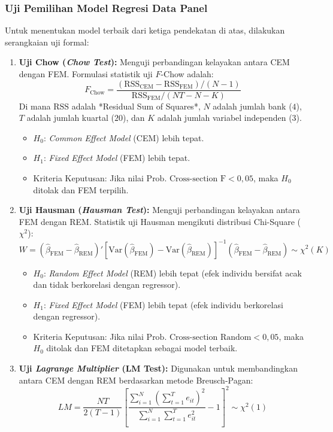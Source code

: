 \documentclass[12pt,a4paper]{article}
\numberwithin{equation}{section}
\begin{document}
\subsubsection{Uji Pemilihan Model Regresi Data Panel}
\noindent
Untuk menentukan model terbaik dari ketiga pendekatan di atas, dilakukan serangkaian uji formal:
\begin{enumerate}
  \item \textbf{Uji Chow (\emph{Chow Test}):} Menguji perbandingan kelayakan antara CEM dengan FEM. Formulasi statistik uji $F$-Chow adalah:
    \begin{equation}
      F_{\text{Chow}} = \frac{(\text{RSS}_{\text{CEM}} - \text{RSS}_{\text{FEM}}) / (N - 1)}{\text{RSS}_{\text{FEM}} / (NT - N - K)}
    \end{equation}
    Di mana $\text{RSS}$ adalah *Residual Sum of Squares*, $N$ adalah jumlah bank ($4$), $T$ adalah jumlah kuartal ($20$), dan $K$ adalah jumlah variabel independen ($3$).
    \begin{itemize}
      \item $H_0$: \emph{Common Effect Model} (CEM) lebih tepat.
      \item $H_1$: \emph{Fixed Effect Model} (FEM) lebih tepat.
      \item Kriteria Keputusan: Jika nilai $\text{Prob. Cross-section F} < 0{,}05$, maka $H_0$ ditolak dan FEM terpilih.
    \end{itemize}
  \item \textbf{Uji Hausman (\emph{Hausman Test}):} Menguji perbandingan kelayakan antara FEM dengan REM. Statistik uji Hausman mengikuti distribusi Chi-Square ($\chi^2$):
    \begin{equation}
      W = (\hat{\beta}_{\text{FEM}} - \hat{\beta}_{\text{REM}})' \left[ \text{Var}(\hat{\beta}_{\text{FEM}}) - \text{Var}(\hat{\beta}_{\text{REM}}) \right]^{-1} (\hat{\beta}_{\text{FEM}} - \hat{\beta}_{\text{REM}}) \sim \chi^2(K)
    \end{equation}
    \begin{itemize}
      \item $H_0$: \emph{Random Effect Model} (REM) lebih tepat (efek individu bersifat acak dan tidak berkorelasi dengan regressor).
      \item $H_1$: \emph{Fixed Effect Model} (FEM) lebih tepat (efek individu berkorelasi dengan regressor).
      \item Kriteria Keputusan: Jika nilai $\text{Prob. Cross-section Random} < 0{,}05$, maka $H_0$ ditolak dan FEM ditetapkan sebagai model terbaik.
    \end{itemize}
  \item \textbf{Uji \emph{Lagrange Multiplier} (LM Test):} Digunakan untuk membandingkan antara CEM dengan REM berdasarkan metode Breusch-Pagan:
    \begin{equation}
      LM = \frac{NT}{2(T-1)} \left[ \frac{\sum_{i=1}^N \left( \sum_{t=1}^T e_{it} \right)^2}{\sum_{i=1}^N \sum_{t=1}^T e_{it}^2} - 1 \right]^2 \sim \chi^2(1)
    \end{equation}
\end{enumerate}
\end{document}
